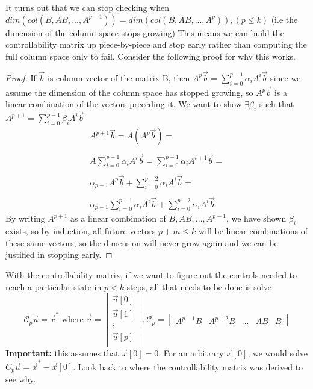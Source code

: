 \documentclass{article}
\newtheorem{proof}{Proof}
\begin{document}
\\\\It turns out that we can stop checking when $dim(col(B, AB,...,A^{p-1}))=dim(col(B, AB, ..., A^p)), (p \leq k)$ (i.e the dimension of the column space stops growing)
This means we can build the controllability matrix up piece-by-piece and stop early rather than computing the full column space only to fail.
Consider the following proof for why this works.
\begin{proof}
    If $\vec{b}$ is column vector of the matrix B, then $A^p \vec{b}=\sum_{i=0}^{p-1}{\alpha_iA^i\vec{b}}$ since we assume the dimension of the column space has stopped growing,
    so $A^p\vec{b}$ is a linear combination of the vectors preceding it.
    We want to show $\exists \beta_i$ such that $A^{p+1}=\sum_{i=0}^{p-1}{\beta_iA^i\vec{b}}$
    \[
        \begin{array}{c}
            A^{p+1}\vec{b}=A(A^p\vec{b}) =\\\\
            A\sum_{i=0}^{p-1}{\alpha_iA^i\vec{b}} = \sum_{i=0}^{p-1}{\alpha_iA^{i+1}\vec{b}}=\\\\
            \alpha_{p-1}A^p\vec{b}+ \sum_{i=0}^{p-2}{\alpha_iA^{i}\vec{b}}=\\\\
            \alpha_{p-1}\sum_{i=0}^{p-1}{\alpha_iA^i\vec{b}}+\sum_{i=0}^{p-2}{\alpha_iA^{i}\vec{b}}
        \end{array}
        \]
    By writing $A^{p+1}$ as a linear combination of $B, AB,...,A^{p-1}$, we have shown $\beta_i$ exists, so by induction, all future vectors $p+m\leq k$ will be linear combinations of these same vectors, 
    so the dimension will never grow again and we can be justified in stopping early.
\end{proof}
With the controllability matrix, if we want to figure out the controls needed to reach a particular state in $p < k$ steps, all that needs to be done is solve
\[
    \mathcal{C}_p\vec{u} = \vec{x}^* \text{ where } \vec{u} = \left[
            \begin{array}{c}
                \vec{u}[0]\\
                \vec{u}[1]\\
                \vdots\\
                \vec{u}[p]\\
            \end{array}\right], \mathcal{C}_p = \left[
                \begin{array}{c|c|c|c|c}
                    A^{p-1}B & A^{p-2}B & ... & AB & B
                \end{array}
            \right]
\]
\textbf{Important: }this assumes that $\vec{x}[0]=0$. For an arbitrary $\vec{x}[0]$, we would solve $C_p\vec{u}=\vec{x}^*-\vec{x}[0]$.
Look back to where the controllability matrix was derived to see why. 
\end{document}
